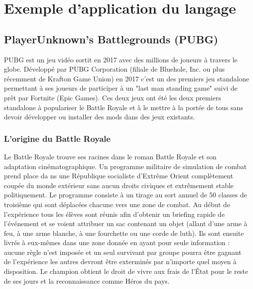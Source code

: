 \chapter{Exemple d'application du langage}
\section{PlayerUnknown's Battlegrounds (PUBG)\cite{wikipubg}}

PUBG est un jeu vidéo sortit en 2017 avec des millions de joueurs à travers le globe. Développé par PUBG Corporation (filiale de Bluehole, Inc. ou plus récemment de Krafton Game Union) en 2017 c'est un des premiers jeu standalone permettant à ses joueurs de participer à un "last man standing game" suivi de prêt par Fortnite (Epic Games). Ces deux jeux ont été les deux premiers standalone à populariser le Battle Royale et à le mettre à la portée de tous sans devoir développer ou installer des mods dans des jeux existants.

\subsection{L'origine du Battle Royale}
Le Battle Royale trouve ses racines dans le roman Battle Royale et son adaptation cinématographique. Un programme militaire de simulation de combat prend place da ns une République socialiste d'Extrême Orient complètement coupée du monde extérieur sans aucun droits civiques et extrêmement stable politiquement. Le programme consiste à un tirage au sort annuel de 50 classes de troisième qui sont déplacées chacune vers une zone de combat. Au début de l'expérience tous les élèves sont réunis afin d'obtenir un briefing rapide de l'événement et se voient attribuer un sac contenant un objet (allant d'une arme à feu, à une arme blanche, à une fourchette ou une corde de luth). Ils sont ensuite livrés à eux-mêmes dans une zone donnée en ayant pour seule information : aucune règle n'est imposée et un seul survivant par groupe pourra être gagnant de l'expérience les autres devront être exterminés par n'importe quel moyen à disposition. Le champion obtient le droit de vivre aux frais de l'État pour le reste de ses jours et la reconnaissance comme Héros du pays.

